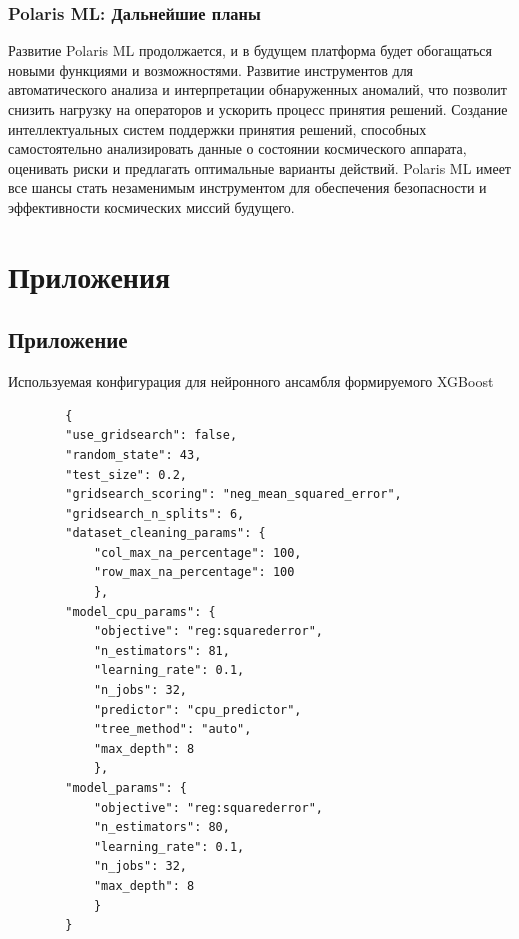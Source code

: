 \documentclass[14pt, a4paper]{extreport}
\begin{document}
    \subsubsection{Polaris ML: Дальнейшие планы}
    Развитие Polaris ML продолжается, и в будущем платформа будет обогащаться новыми функциями и возможностями.
    Развитие инструментов для автоматического анализа и интерпретации обнаруженных аномалий, что позволит снизить нагрузку на операторов и ускорить процесс принятия решений.
    Создание интеллектуальных систем поддержки принятия решений, способных самостоятельно анализировать данные о состоянии космического аппарата, оценивать риски и предлагать оптимальные варианты действий.
    Polaris ML имеет все шансы стать незаменимым инструментом для обеспечения безопасности и эффективности космических миссий будущего.

    \newpage

    
    

    \newpage

    \appendix

    \titleformat{\section}[block]{\large\bfseries\filcenter}{}{0em}{}
    \titleformat{\subsection}[block]{\textnormal\bfseries}{}{0em}{}

    \section{Приложения} \label{sec:attachements}

    \subsection{Приложение } \label{subsec:polaris_learn_config}

    Используемая конфигурация для нейронного ансамбля формируемого XGBoost
    
    \begin{verbatim}
        {
        "use_gridsearch": false,
        "random_state": 43,
        "test_size": 0.2,
        "gridsearch_scoring": "neg_mean_squared_error",
        "gridsearch_n_splits": 6,
        "dataset_cleaning_params": {
            "col_max_na_percentage": 100,
            "row_max_na_percentage": 100
            },
        "model_cpu_params": {
            "objective": "reg:squarederror",
            "n_estimators": 81,
            "learning_rate": 0.1,
            "n_jobs": 32,
            "predictor": "cpu_predictor",
            "tree_method": "auto",
            "max_depth": 8
            },
        "model_params": {
            "objective": "reg:squarederror",
            "n_estimators": 80,
            "learning_rate": 0.1,
            "n_jobs": 32,
            "max_depth": 8
            }
        }
    \end{verbatim}
\end{document}
